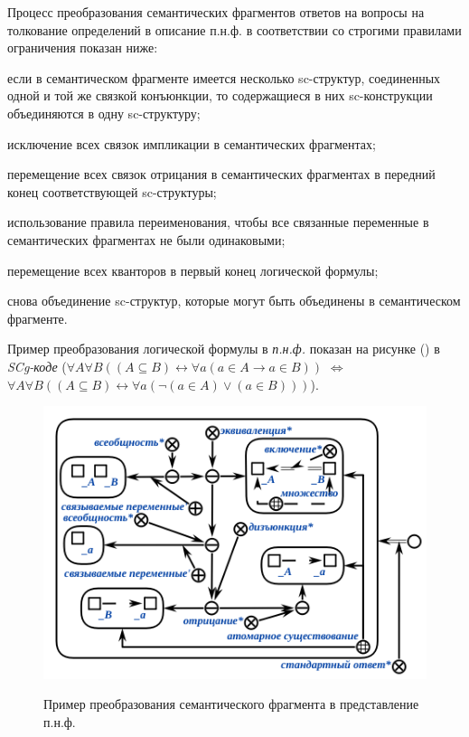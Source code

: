 Процесс преобразования семантических фрагментов ответов на вопросы на толкование определений в описание п.н.ф. в соответствии со строгими правилами ограничения показан ниже:

\begin{textitemize}
	\item если в семантическом фрагменте имеется несколько sc-структур, соединенных одной и той же связкой конъюнкции, то содержащиеся в них sc-конструкции объединяются в одну sc-структуру;
	
	\item исключение всех связок импликации в семантических фрагментах;
	
	\item перемещение всех связок отрицания в семантических фрагментах в передний конец соответствующей sc-структуры;
	
	\item использование правила переименования, чтобы все связанные переменные в семантических фрагментах не были одинаковыми;
	
	\item перемещение всех кванторов в первый конец логической формулы;
	
	\item снова объединение sc-структур, которые могут быть объединены в семантическом фрагменте.
	
\end{textitemize}

Пример преобразования логической формулы в \textit{п.н.ф.} показан на рисунке (\textit{}) в \textit{SCg-коде} ($\forall A\forall B((A\subseteq B) \leftrightarrow \forall a(a\in A\rightarrow a\in B))$ $\Leftrightarrow$ $\forall A\forall B((A\subseteq B) \leftrightarrow \forall a ( \neg ( a\in A ) \lor (a\in B)))$).

\begin{figure}[H]
	\caption{Пример преобразования семантического фрагмента в представление п.н.ф.}
	\includegraphics[scale=0.8]{author/part7/figures/PNF_example.png}
	\label{fig:PNF_example}
\end{figure}

